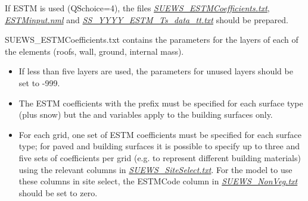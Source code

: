 \documentclass[letterpaper,10pt,english]{sphinxmanual}
\begin{document}
If ESTM is used (QSchoice=4), the files
{\hyperref[\detokenize{input_files/ESTM_input:SUEWS_ESTMCoefficients.txt}]{\emph{SUEWS\_ESTMCoefficients.txt}}},
{\hyperref[\detokenize{input_files/ESTM_input:ESTMinput.nml}]{\emph{ESTMinput.nml}}} and
{\hyperref[\detokenize{input_files/ESTM_input:SS_YYYY_ESTM_Ts_data_tt.txt}]{\emph{SS\_YYYY\_ESTM\_Ts\_data\_tt.txt}}} should be
prepared.

SUEWS\_ESTMCoefficients.txt contains the parameters for the layers of
each of the elements (roofs, wall, ground, internal mass).
\begin{itemize}
\item {} 
If less than five layers are used, the parameters for unused layers
should be set to -999.

\item {} 
The ESTM coefficients with the prefix  must be specified for
each surface type (plus snow) but the  and 
variables apply to the building surfaces only.

\item {} 
For each grid, one set of ESTM coefficients must be specified for
each surface type; for paved and building surfaces it is possible to
specify up to three and five sets of coefficients per grid (e.g. to
represent different building materials) using the relevant columns in
{\hyperref[\detokenize{input_files/ESTM_input:SUEWS_SiteSelect.txt}]{\emph{SUEWS\_SiteSelect.txt}}}. For the model to
use these columns in site select, the ESTMCode column in
{\hyperref[\detokenize{input_files/ESTM_input:SUEWS_NonVeg.txt}]{\emph{SUEWS\_NonVeg.txt}}} should be set to zero.

\end{itemize}
\end{document}
